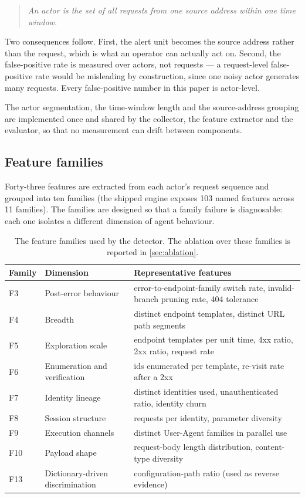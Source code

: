 \documentclass[11pt]{article}
\begin{document}
\begin{quote}
\itshape
An actor is the set of all requests from one source address within one time window.
\end{quote}

Two consequences follow. First, the alert unit becomes the source address rather than the
request, which is what an operator can actually act on. Second, the false-positive rate is
measured over actors, not requests --- a request-level false-positive rate would be misleading
by construction, since one noisy actor generates many requests. Every false-positive number in
this paper is actor-level.

The actor segmentation, the time-window length and the source-address grouping are implemented
once and shared by the collector, the feature extractor and the evaluator, so that no
measurement can drift between components.

\subsection{Feature families}
\label{sec:families}

Forty-three features are extracted from each actor's request sequence and grouped into ten
families (the shipped engine exposes 103 named features across 11 families). The families are
designed so that a family failure is diagnosable: each one isolates a different dimension of
agent behaviour.

\begin{table}[t]
\centering
\caption{The feature families used by the detector. The ablation over these families is
reported in \ref{sec:ablation}.}
\label{tab:families}
\begin{tabularx}{\textwidth}{@{}L{0.08\textwidth}L{0.22\textwidth}Y@{}}
\toprule
\textbf{Family} & \textbf{Dimension} & \textbf{Representative features} \\
\midrule
F3  & Post-error behaviour & error-to-endpoint-family switch rate, invalid-branch pruning rate, 404 tolerance \\
F4  & Breadth & distinct endpoint templates, distinct URL path segments \\
F5  & Exploration scale & endpoint templates per unit time, 4xx ratio, 2xx ratio, request rate \\
F6  & Enumeration and verification & ids enumerated per template, re-visit rate after a 2xx \\
F7  & Identity lineage & distinct identities used, unauthenticated ratio, identity churn \\
F8  & Session structure & requests per identity, parameter diversity \\
F9  & Execution channels & distinct User-Agent families in parallel use \\
F10 & Payload shape & request-body length distribution, content-type diversity \\
F13 & Dictionary-driven discrimination & configuration-path ratio (used as reverse evidence) \\
\bottomrule
\end{tabularx}
\end{table}
\end{document}
